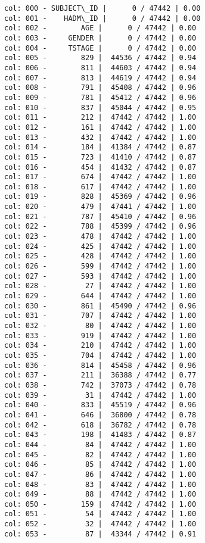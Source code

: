 \documentclass[11pt]{article}
\begin{document}
    \begin{Verbatim}[commandchars=\\\{\}]
col: 000 - SUBJECT\_ID |      0 / 47442 | 0.00
col: 001 -    HADM\_ID |      0 / 47442 | 0.00
col: 002 -        AGE |      0 / 47442 | 0.00
col: 003 -     GENDER |      0 / 47442 | 0.00
col: 004 -     TSTAGE |      0 / 47442 | 0.00
col: 005 -        829 |  44536 / 47442 | 0.94
col: 006 -        811 |  44603 / 47442 | 0.94
col: 007 -        813 |  44619 / 47442 | 0.94
col: 008 -        791 |  45408 / 47442 | 0.96
col: 009 -        781 |  45412 / 47442 | 0.96
col: 010 -        837 |  45044 / 47442 | 0.95
col: 011 -        212 |  47442 / 47442 | 1.00
col: 012 -        161 |  47442 / 47442 | 1.00
col: 013 -        432 |  47442 / 47442 | 1.00
col: 014 -        184 |  41384 / 47442 | 0.87
col: 015 -        723 |  41410 / 47442 | 0.87
col: 016 -        454 |  41432 / 47442 | 0.87
col: 017 -        674 |  47442 / 47442 | 1.00
col: 018 -        617 |  47442 / 47442 | 1.00
col: 019 -        828 |  45369 / 47442 | 0.96
col: 020 -        479 |  47441 / 47442 | 1.00
col: 021 -        787 |  45410 / 47442 | 0.96
col: 022 -        788 |  45399 / 47442 | 0.96
col: 023 -        478 |  47442 / 47442 | 1.00
col: 024 -        425 |  47442 / 47442 | 1.00
col: 025 -        428 |  47442 / 47442 | 1.00
col: 026 -        599 |  47442 / 47442 | 1.00
col: 027 -        593 |  47442 / 47442 | 1.00
col: 028 -         27 |  47442 / 47442 | 1.00
col: 029 -        644 |  47442 / 47442 | 1.00
col: 030 -        861 |  45490 / 47442 | 0.96
col: 031 -        707 |  47442 / 47442 | 1.00
col: 032 -         80 |  47442 / 47442 | 1.00
col: 033 -        919 |  47442 / 47442 | 1.00
col: 034 -        210 |  47442 / 47442 | 1.00
col: 035 -        704 |  47442 / 47442 | 1.00
col: 036 -        814 |  45458 / 47442 | 0.96
col: 037 -        211 |  36388 / 47442 | 0.77
col: 038 -        742 |  37073 / 47442 | 0.78
col: 039 -         31 |  47442 / 47442 | 1.00
col: 040 -        833 |  45519 / 47442 | 0.96
col: 041 -        646 |  36800 / 47442 | 0.78
col: 042 -        618 |  36782 / 47442 | 0.78
col: 043 -        198 |  41483 / 47442 | 0.87
col: 044 -         84 |  47442 / 47442 | 1.00
col: 045 -         82 |  47442 / 47442 | 1.00
col: 046 -         85 |  47442 / 47442 | 1.00
col: 047 -         86 |  47442 / 47442 | 1.00
col: 048 -         83 |  47442 / 47442 | 1.00
col: 049 -         88 |  47442 / 47442 | 1.00
col: 050 -        159 |  47442 / 47442 | 1.00
col: 051 -         54 |  47442 / 47442 | 1.00
col: 052 -         32 |  47442 / 47442 | 1.00
col: 053 -         87 |  43344 / 47442 | 0.91

\end{Verbatim}
\end{document}

